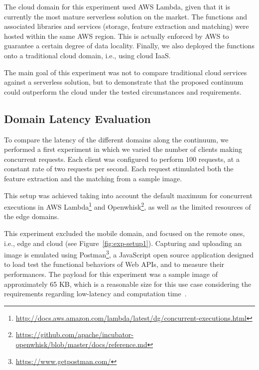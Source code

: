 The cloud domain for this experiment used AWS Lambda, given that it is currently the most mature serverless solution on the market. The functions and associated libraries and services (storage, feature extraction and matching) were hosted within the same AWS region. This is actually enforced by AWS to guarantee a certain degree of data locality. Finally, we also deployed the functions onto a traditional cloud domain, i.e., using cloud IaaS. 

The main goal of this experiment was not to compare traditional cloud services against a serverless solution, but to demonstrate that the proposed continuum could outperform the cloud under the tested circumstances and requirements.


\subsection{Domain Latency Evaluation} 

To compare the latency of the different domains along the continuum, we performed a first experiment in which we varied the number of clients making concurrent requests. Each client was configured to perform $100$ requests, at a constant rate of two requests per second. Each request stimulated both the feature extraction and the matching from a sample image. 

This setup was achieved taking into account the default maximum for concurrent executions in AWS Lambda\footnote{\url{http://docs.aws.amazon.com/lambda/latest/dg/concurrent-executions.html}} and Openwhisk\footnote{\url{https://github.com/apache/incubator-openwhisk/blob/master/docs/reference.md}}, as well as the limited resources of the edge domains. 

This experiment excluded the mobile domain, and focused on the remote ones, i.e., edge and cloud (see Figure~\ref{fig:exp-setup1}). Capturing and uploading an image is emulated using Postman\footnote{\url{https://www.getpostman.com/}}, a JavaScript open source application designed to load test the functional behaviors of Web APIs, and to measure their performances. The  payload for this experiment was a sample image of approximately 65 KB, which is a reasonable size for this use case considering the requirements regarding low-latency and computation time~\cite{rodriguez16mobile}. 


